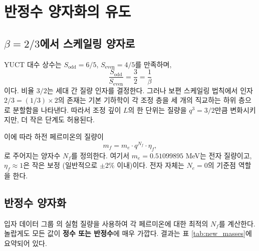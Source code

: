 \documentclass[12pt,a4paper]{article}
\newcommand{\Sodd}{S_{\mathrm{odd}}}
\newcommand{\Seven}{S_{\mathrm{even}}}
\begin{document}
	\section{반정수 양자화의 유도}
	
	\subsection{\(\beta = 2/3\)에서 스케일링 양자로}
	
	YUCT 대수 상수는 \(\Sodd = 6/5\), \(\Seven = 4/5\)를 만족하며,
	\[
	\frac{\Sodd}{\Seven} = \frac{3}{2} = \frac{1}{\beta}
	\]
	이다. 비율 \(3/2\)는 세대 간 질량 인자를 결정한다. 그러나 보편 스케일링 법칙에서 인자 \(2/3 = (1/3) \times 2\)의 존재는 기본 기하학이 각 조정 층을 세 개의 직교하는 하위 층으로 분할함을 나타낸다. 따라서 조정 깊이 \(L\)의 한 단위는 질량을 \(q^3 = 3/2\)만큼 변화시키지만, 더 작은 단계도 허용된다.
	
	이에 따라 하전 페르미온의 질량이
	\begin{equation}
		m_f = m_e \cdot q^{N_f} \cdot \eta_f,
		\label{eq:new}
	\end{equation}
	로 주어지는 양자수 \(N_f\)를 정의한다. 여기서 \(m_e = 0.51099895\) MeV는 전자 질량이고, \(\eta_f \approx 1\)은 작은 보정 (일반적으로 \(\pm 2\%\) 이내)이다. 전자 자체는 \(N_e = 0\)의 기준점 역할을 한다.
	
	\subsection{반정수 양자화}
	
	입자 데이터 그룹 \cite{PDG2024}의 실험 질량을 사용하여 각 페르미온에 대한 최적의 \(N_f\)를 계산한다. 놀랍게도 모든 값이 \textbf{정수 또는 반정수}에 매우 가깝다. 결과는 표 \ref{tab:new_masses}에 요약되어 있다.
	
\end{document}
